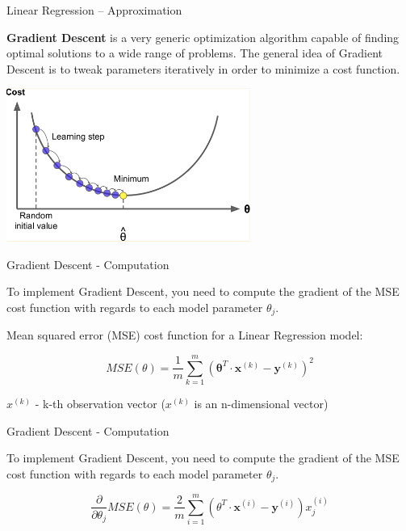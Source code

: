 \documentclass{beamer}
\begin{document}

\begin{frame}
{\centerline{Linear Regression -- Approximation}}

\textbf{Gradient Descent} is a very generic optimization algorithm capable of finding optimal solutions to a wide range of problems. The general idea of Gradient Descent is to tweak parameters iteratively in order to minimize a cost function.

\begin{center}
\includegraphics[width=8cm]{P2023.AIBCCSS.FoundationsDataScience/gd-1.png}
\end{center}


\end{frame}


\begin{frame}
{\centerline{Gradient Descent -  Computation }}


To implement Gradient Descent, you need to compute the gradient of the MSE cost function with regards to each model parameter $\theta_j$.

Mean squared error (MSE) cost function for a Linear Regression model:

$$MSE (\theta) = \frac{1}{m}\sum_{k=1}^{m} (\boldsymbol \theta^T \cdot \boldsymbol x^{(k)} - \boldsymbol y^{(k)})^2$$

$x^{(k)}$ - k-th observation vector ($x^{(k)}$ is an n-dimensional vector)



\end{frame}


\begin{frame}
{\centerline{Gradient Descent -  Computation }}


To implement Gradient Descent, you need to compute the gradient of the MSE cost function with regards to each model parameter $\theta_j$.

$$\frac{\partial}{\partial \theta_j}MSE(\theta) = \frac{2}{m} \sum_{i=1}^{m}(\theta^T \cdot \boldsymbol x^{(i)} - \boldsymbol y^{(i)}  ) x_j^{(i)}$$
\end{frame}
\end{document}
